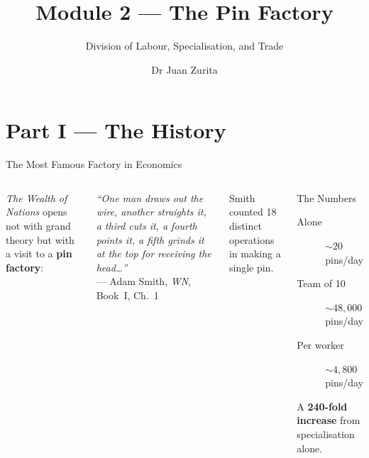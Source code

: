 \documentclass[aspectratio=169, 10pt]{beamer}
\title{Module 2 --- The Pin Factory}
\subtitle{Division of Labour, Specialisation, and Trade}
\author{Dr Juan Zurita}
\institute{From Smith to Simulation\\
The University of Edinburgh~$\cdot$~School of Economics}
\date{}
\begin{document}
\maketitle

\section{Part I --- The History}

\begin{frame}{The Most Famous Factory in Economics}
\begin{columns}[T]
\textit{The Wealth of Nations} opens not with grand theory but with a visit
to a \textbf{pin factory}:
\vspace{0.5em}
\begin{center}
\textit{``One man draws out the wire, another straights it,
a third cuts it, a fourth points it, a fifth grinds it
at the top for receiving the head\ldots''}\\[4pt]
--- Adam Smith, \textit{WN}, Book~I, Ch.~1
\end{center}
\vspace{0.5em}
Smith counted \alert{18 distinct operations} in making a single pin.
\begin{block}{The Numbers}
\begin{description}
  \item[Alone] $\sim 20$ pins/day
  \item[Team of 10] $\sim 48{,}000$ pins/day
  \item[Per worker] $\sim 4{,}800$ pins/day
\end{description}
\vspace{0.3em}
A \textbf{240-fold increase} from specialisation alone.
\end{block}
\end{columns}
\end{frame}
\end{document}
